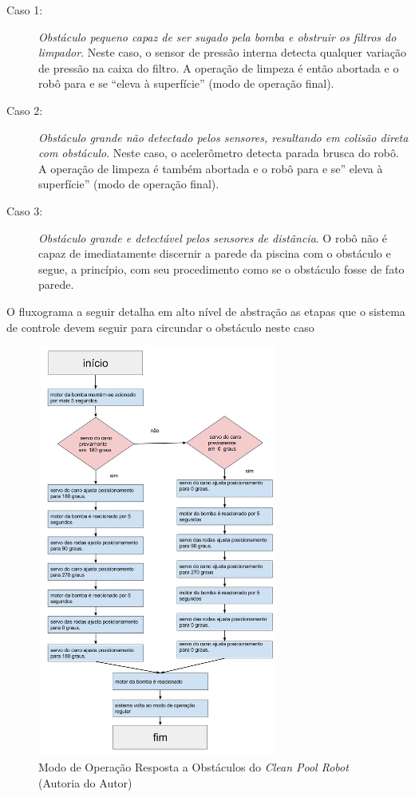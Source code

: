 \begin{description}
\item[Caso 1:] \textit{Obstáculo pequeno capaz de ser sugado pela bomba e obstruir os
filtros do limpador}. Neste caso, o sensor de pressão interna detecta qualquer
variação de pressão na caixa do filtro.  A operação de limpeza é então abortada
e o robô para e se “eleva à superfície” (modo de operação final).
\item[Caso 2:] \textit{Obstáculo grande não detectado pelos sensores, resultando em
colisão direta com obstáculo}. Neste caso, o acelerômetro detecta parada brusca
do robô. A operação de limpeza é  também abortada e o robô para e se” eleva à
superfície” (modo de operação final).
\item[Caso 3:] \textit{Obstáculo grande e detectável pelos sensores de distância}. O
robô não é capaz de imediatamente discernir a parede da piscina com o obstáculo
e segue, a princípio, com seu procedimento como se o obstáculo fosse de fato parede.
\end{description}
\par
O fluxograma a seguir detalha em alto nível de abstração as etapas que o sistema
de controle devem seguir para circundar o obstáculo neste caso
\par
\begin{figure}[h]
  \centering
  \includegraphics[width=0.7\textwidth]{figures/flow-robot-obstacle.jpg}
  \caption{Modo de Operação Resposta a Obstáculos do \textit{Clean Pool Robot} (\textsf{Autoria do Autor})}
  \label{fig:flow-obstacle-robot}
\end{figure}
\FloatBarrier

